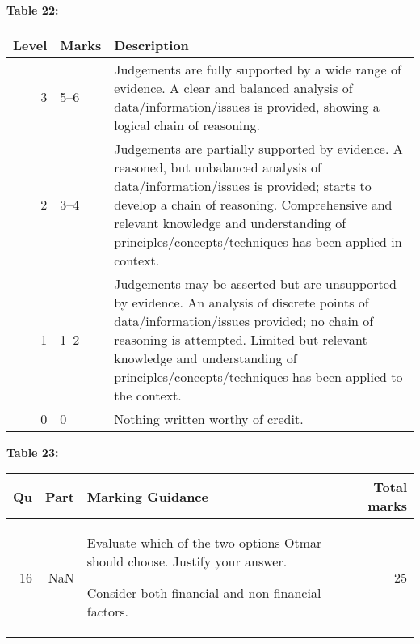 \documentclass{article}
\begin{document}
\textbf{Table 22:}
\begin{tabular}{rll}
\toprule
Level & Marks & Description \\
\midrule
3 & 5–6 & Judgements are fully supported by a wide range of evidence.  A clear and balanced
analysis of data/information/issues is provided, showing a logical chain of reasoning. \\
2 & 3–4 & Judgements are partially supported by evidence.  A reasoned, but unbalanced
analysis of data/information/issues is provided; starts to develop a chain of
reasoning.  Comprehensive and relevant knowledge and understanding of
principles/concepts/techniques has been applied in context. \\
1 & 1–2 & Judgements may be asserted but are unsupported by evidence.  An analysis of
discrete points of data/information/issues provided; no chain of reasoning is
attempted.  Limited but relevant knowledge and understanding of
principles/concepts/techniques has been applied to the context. \\
0 & 0 & Nothing written worthy of credit. \\
\bottomrule
\end{tabular}

\textbf{Table 23:}
\begin{tabular}{rrlr}
\toprule
Qu & Part & Marking Guidance & Total
marks \\
\midrule
16 & NaN & Evaluate which of the two options Otmar should choose.  Justify your answer.

Consider both financial and non-financial factors. & 25 \\
\bottomrule
\end{tabular}
\end{document}
